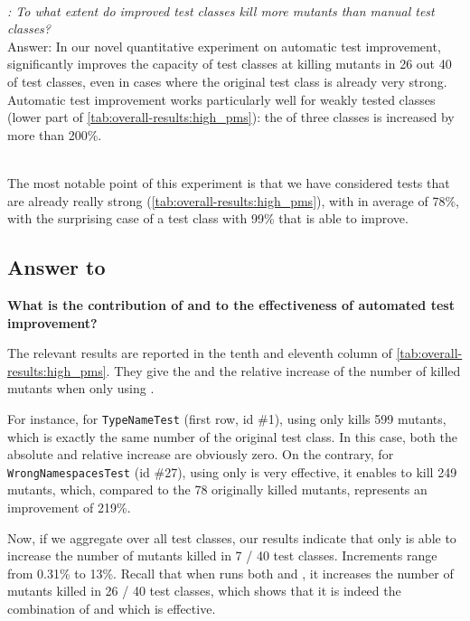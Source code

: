 ~\\
\begin{mdframed}
	\textit{\rqeffectiveness: To what extent do improved  test classes kill more mutants than manual test classes?}\\
	Answer: In our novel quantitative experiment on automatic test improvement, \dspot significantly improves the capacity of test classes at killing mutants in 26 out 40 of test classes, even in cases where the original test class is already very strong. 
	Automatic test improvement works particularly well for weakly tested classes (lower part of \autoref{tab:overall-results:high_pms}): the \ms of three classes is increased by more than 200\%.
\end{mdframed}
~\\
The most notable point of this experiment is that we have considered tests that are already really strong (\autoref{tab:overall-results:high_pms}), with \ms in average of 78\%, with the surprising case of a test class with 99\% \ms that \dspot is able to improve. 


\subsection{Answer to \rqAmplVersusIAmpl}

\textbf{What is the contribution of \Iampl{} and \Aampl{} to the effectiveness of automated test improvement?}

The relevant results are reported in the tenth and eleventh column of \autoref{tab:overall-results:high_pms}. %
They give the \ams and the relative increase of the number of killed mutants when only using \Aampl.

For instance, for \texttt{TypeNameTest} (first row, id \#1), using only \Aampl kills 599 mutants, which is exactly the same number of the original test class. In this case, both the absolute and relative increase are obviously zero.
On the contrary, for \texttt{WrongNamespacesTest} (id \#27), using only \Aampl  is very effective, it enables \dspot to kill 249 mutants, which, compared to the 78 originally killed mutants, represents an improvement of 219\%. 

Now, if we aggregate over all test classes, our results indicate that \Aampl only is able to increase the number of mutants killed in 7 / 40 test classes. Increments range from 0.31\% to 13\%. 
Recall that when \dspot runs both \Iampl{} and \Aampl, it increases the number of mutants killed in 26 / 40 test classes, which shows that it is indeed the combination of \Aampl and \Iampl which is effective.

